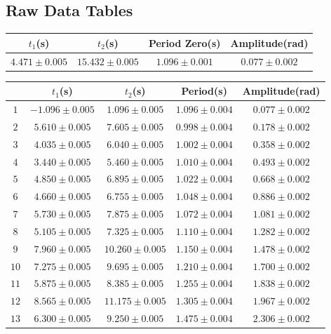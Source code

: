 \subsection{Raw Data Tables}
\begin{center}
  \begin{tabular}{|c|c|c|c|}
    \hline
    $t_1$(s)        & $t_2$(s)         & Period Zero(s)   & Amplitude(rad)  \\
    \hline
    $4.471\pm0.005$ & $15.432\pm0.005$ & $1.096\pm0.001$ & $0.077\pm0.002$ \\
    \hline
  \end{tabular}
  \label{tabLowAmplitude}
\end{center}
\begin{center}
  \begin{tabular}{|c|c|c|c|c|}
    \hline
         & $t_1$(s)         & $t_2$(s)         & Period(s)        & Amplitude(rad)  \\
    \hline
    $1$  & $-1.096\pm0.005$ & $1.096\pm0.005$  & $1.096\pm0.004$ & $0.077\pm0.002$ \\
    \hline
    $2$  & $5.610\pm0.005$  & $7.605\pm0.005$  & $0.998\pm0.004$ & $0.178\pm0.002$ \\
    \hline
    $3$  & $4.035\pm0.005$  & $6.040\pm0.005$  & $1.002\pm0.004$ & $0.358\pm0.002$ \\
    \hline
    $4$  & $3.440\pm0.005$  & $5.460\pm0.005$  & $1.010\pm0.004$ & $0.493\pm0.002$ \\
    \hline
    $5$  & $4.850\pm0.005$  & $6.895\pm0.005$  & $1.022\pm0.004$ & $0.668\pm0.002$ \\
    \hline
    $6$  & $4.660\pm0.005$  & $6.755\pm0.005$  & $1.048\pm0.004$ & $0.886\pm0.002$ \\
    \hline
    $7$  & $5.730\pm0.005$  & $7.875\pm0.005$  & $1.072\pm0.004$ & $1.081\pm0.002$ \\
    \hline
    $8$  & $5.105\pm0.005$  & $7.325\pm0.005$  & $1.110\pm0.004$ & $1.282\pm0.002$ \\
    \hline
    $9$  & $7.960\pm0.005$  & $10.260\pm0.005$ & $1.150\pm0.004$ & $1.478\pm0.002$ \\
    \hline
    $10$ & $7.275\pm0.005$  & $9.695\pm0.005$  & $1.210\pm0.004$ & $1.700\pm0.002$ \\
    \hline
    $11$ & $5.875\pm0.005$  & $8.385\pm0.005$  & $1.255\pm0.004$ & $1.838\pm0.002$ \\
    \hline
    $12$ & $8.565\pm0.005$  & $11.175\pm0.005$ & $1.305\pm0.004$ & $1.967\pm0.002$ \\
    \hline
    $13$ & $6.300\pm0.005$  & $9.250\pm0.005$  & $1.475\pm0.004$ & $2.306\pm0.002$ \\
    \hline
  \end{tabular}
  \label{tabLargeAmplitude}
\end{center}


